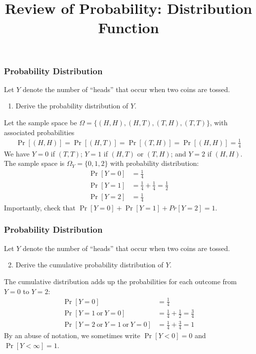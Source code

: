\title[Probability]{Review of Probability: Distribution Function}
\date{}







\def\ask{Let $Y$ denote the number of ``heads'' that occur when two coins are tossed.}

\begin{frame}
\frametitle{Probability Distribution}
\ask
\begin{enumerate}\setcounter{enumi}{0}
\item Derive the probability distribution of $Y$.
\end{enumerate}

\begin{answer}
Let the sample space be $\Omega=\{(H,H),(H,T),(T,H),(T,T)\}$, with associated probabilities
\begin{align*}
\Pr[(H,H)] 
  = \Pr[(H,T)] 
  = \Pr[(T,H)]
  = \Pr[(H,H)] 
  = \frac{1}{4}
\end{align*}
We have $Y=0$ if $(T,T)$; $Y=1$ if $(H,T)$ or $(T,H)$; and $Y=2$ if $(H,H)$.
The sample space is $\Omega_Y=\{0,1,2\}$ with probability distribution:
\begin{align*}
\Pr[Y=0] & = \frac{1}{4} \\
\Pr[Y=1] & = \frac{1}{4} + \frac{1}{4} = \frac{1}{2}\\
\Pr[Y=2] & = \frac{1}{4}
\end{align*}
Importantly, check that $\Pr[Y=0]+\Pr[Y=1]+Pr[Y=2]=1$. 
\end{answer}

\end{frame}


\begin{frame}
\frametitle{Probability Distribution}
\ask
\begin{enumerate}\setcounter{enumi}{1}
\item Derive the cumulative probability distribution of $Y$.
\end{enumerate}

\begin{answer}
The cumulative distribution adds up the probabilities for each outcome from $Y=0$ to $Y=2$:
\begin{align*}
\Pr[Y=0] & = \frac{1}{4} \\
\Pr[Y=1~\text{or}~Y=0] & = \frac{1}{4} + \frac{1}{2} = \frac{3}{4}\\
\Pr[Y=2~\text{or}~Y=1~\text{or}~Y=0] & = \frac{1}{4} + \frac{3}{4} = 1
\end{align*}
By an abuse of notation, we sometimes write $\Pr[Y<0]=0$ and $\Pr[Y<\infty]=1$.
\end{answer}

\end{frame}


